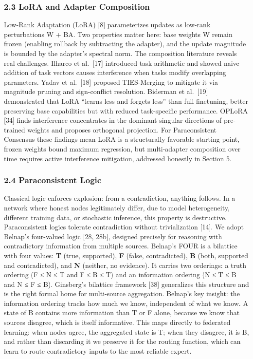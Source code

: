 \subsubsection{2.3 LoRA and Adapter
Composition}\label{lora-and-adapter-composition}

Low-Rank Adaptation (LoRA) {[}8{]} parameterizes updates as low-rank
perturbations W + BA. Two properties matter here: base weights W remain
frozen (enabling rollback by subtracting the adapter), and the update
magnitude is bounded by the adapter's spectral norm. The composition
literature reveals real challenges. Ilharco et al.~{[}17{]} introduced
task arithmetic and showed naive addition of task vectors causes
interference when tasks modify overlapping parameters. Yadav et
al.~{[}18{]} proposed TIES-Merging to mitigate it via magnitude pruning
and sign-conflict resolution. Biderman et al.~{[}19{]} demonstrated that
LoRA ``learns less and forgets less'' than full finetuning, better
preserving base capabilities but with reduced task-specific performance.
OPLoRA {[}34{]} finds interference concentrates in the dominant singular
directions of pre-trained weights and proposes orthogonal projection.
For Paraconsistent Consensus these findings mean LoRA is a structurally
favorable starting point, frozen weights bound maximum regression, but
multi-adapter composition over time requires active interference
mitigation, addressed honestly in Section 5.

\subsubsection{2.4 Paraconsistent Logic}\label{paraconsistent-logic}

Classical logic enforces explosion: from a contradiction, anything
follows. In a network where honest nodes legitimately differ, due to
model heterogeneity, different training data, or stochastic inference,
this property is destructive. Paraconsistent logics tolerate
contradiction without trivialization {[}14{]}. We adopt Belnap's
four-valued logic {[}28, 28b{]}, designed precisely for reasoning with
contradictory information from multiple sources. Belnap's FOUR is a
bilattice with four values: \textbf{T} (true, supported), \textbf{F}
(false, contradicted), \textbf{B} (both, supported and contradicted),
and \textbf{N} (neither, no evidence). It carries two orderings: a truth
ordering (F ≤ N ≤ T and F ≤ B ≤ T) and an information ordering (N ≤ T ≤
B and N ≤ F ≤ B). Ginsberg's bilattice framework {[}38{]} generalizes
this structure and is the right formal home for multi-source
aggregation. Belnap's key insight: the information ordering tracks how
much we know, independent of what we know. A state of B contains more
information than T or F alone, because we know that sources disagree,
which is itself informative. This maps directly to federated learning:
when nodes agree, the aggregated state is T; when they disagree, it is
B, and rather than discarding it we preserve it for the routing
function, which can learn to route contradictory inputs to the most
reliable expert.

